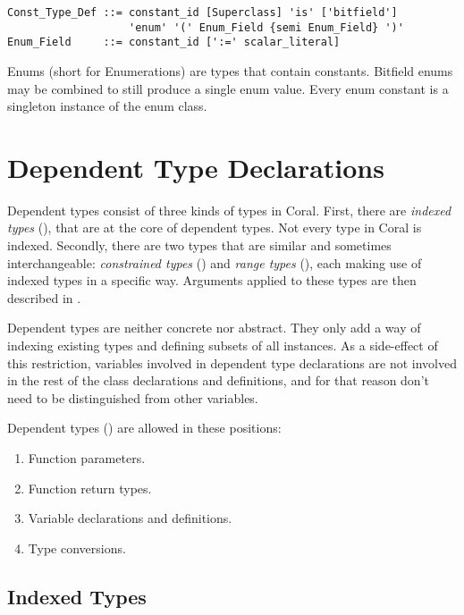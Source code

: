 \syntax\begin{lstlisting}
Const_Type_Def ::= constant_id [Superclass] 'is' ['bitfield'] 
                   'enum' '(' Enum_Field {semi Enum_Field} ')'
Enum_Field     ::= constant_id [':=' scalar_literal]
\end{lstlisting}


Enums (short for Enumerations) are types that contain constants. Bitfield enums may be combined to still produce a single enum value. Every enum constant is a singleton instance of the enum class. 

\section{Dependent Type Declarations}
\label{sec:dependent-types-decl}

Dependent types consist of three kinds of types in Coral. First, there are {\em indexed types} (), that are at the core of dependent types. Not every type in Coral is indexed. Secondly, there are two types that are similar and sometimes interchangeable: {\em constrained types} () and {\em range types} (), each making use of indexed types in a specific way. Arguments applied to these types are then described in . 

Dependent types are neither concrete nor abstract. They only add a way of indexing existing types and defining subsets of all instances. As a side-effect of this restriction, variables involved in dependent type declarations are not involved in the rest of the class declarations and definitions, and for that reason don't need to be distinguished from other variables. 

Dependent types () are allowed in these positions: 
\begin{enumerate}
\item Function parameters. 
\item Function return types. 
\item Variable declarations and definitions. 
\item Type conversions. 
\end{enumerate}

\subsection{Indexed Types}
\label{sec:indexed-types}

